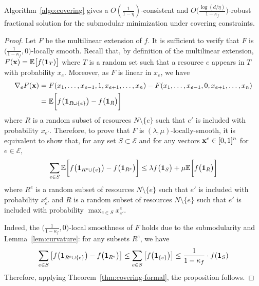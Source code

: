 \setcounter{theorem}{6}
\begin{proposition}
Algorithm~\ref{algo:covering} gives a
$O(\frac{1}{1 - \eta})$-consistent and $O\bigl( \frac{\log (d/\eta)}{1 - \kappa_{f}} \bigr)$-robust fractional  solution
for the submodular minimization under covering constraints.
\end{proposition}
\begin{proof}
Let $F$ be the multilinear extension of $f$.
It is sufficient to verify that $F$ is $\bigl(\frac{1}{1-\kappa_{f}},0\bigr)$-locally smooth.
Recall that, by definition of the multilinear extension,
$F(\mathbf{x}) = \mathbb{E} \bigl[ f(\mathbf{1}_{T})\bigr]$ where $T$ is a random set
such that a resource $e$ appears in $T$ with probability $x_{e}$. Moreover, as $F$ is linear in $x_{e}$, we have
%
\begin{align*}
\nabla_{e} F(\vect{x}) %
&= F(x_{1}, \ldots, x_{e-1}, 1, x_{e+1}, \ldots, x_{n}) - F(x_{1}, \ldots, x_{e-1}, 0, x_{e+1}, \ldots, x_{n}) \\
&= \mathbb{E} \biggl[ f\bigl(\vect{1}_{R \cup \{e\}}\bigr) - f\bigl(\vect{1}_{R}\bigr) \biggr]
\end{align*}
where $R$ is a random subset of resources $N \setminus \{e\}$ such that $e'$ is included with probability $x_{e'}$.
Therefore, to prove that $F$ is $(\lambda,\mu)$-locally-smooth, it is equivalent to show that,
for any set $S \subset \mathcal{E}$ and for any vectors $\mathbf{x}^{e} \in [0,1]^{n}$ for $e \in \mathcal{E}$,
%
\begin{equation*}	\label{eq:min-local-smooth-equiv}
\sum_{e \in S} \mathbb{E} \biggl[ f\bigl(\mathbf{1}_{R^{e} \cup \{e\}}\bigr) - f\bigl(\mathbf{1}_{R^{e}}\bigr) \biggr]
\leq \lambda f\bigl( \mathbf{1}_{S} \bigr) + \mu \mathbb{E} \biggl[ f\bigl(\mathbf{1}_{R}\bigr) \biggr]
\end{equation*}
%
where $R^{e}$ is a random subset of resources $N \setminus \{e\}$ such that $e'$ is included with probability $x^{e}_{e'}$
and $R$ is a random subset of resources $N \setminus \{e\}$ such that $e'$ is included with probability $\max_{e \in S} x^{e}_{e'}$.

Indeed, the
$\bigl(\frac{1}{1-\kappa_{f}},0\bigr)$-local smoothness of $F$ holds due to the submodularity and Lemma~\ref{lem:curvature}:
for any subsets $R^{e}$, we have
\begin{align*}
	\sum_{e \in S} \left[ f\bigl(\mathbf{1}_{R^{e} \cup \{e\}}\bigr) - f\bigl(\mathbf{1}_{R^{e}}\bigr) \right]
		\leq \sum_{e \in S} \left[ f\bigl(\mathbf{1}_{\{e\}}\bigr) \right]
		\leq \frac{1}{1 -\kappa_{f}} \cdot f(\mathbf{1}_{S})
\end{align*}
Therefore, applying Theorem~\ref{thm:covering-formal}, the proposition follows.
\end{proof}

